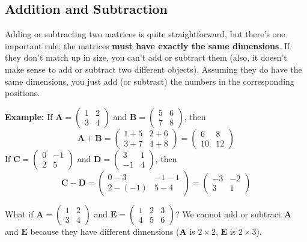 \documentclass[11pt]{article}
\begin{document}
\subsection{Addition and Subtraction}

Adding or subtracting two matrices is quite straightforward, but there's one important rule: the matrices \textbf{must have exactly the same dimensions}. If they don't match up in size, you can't add or subtract them (also, it doesn't make sense to add or subtract two different objects). Assuming they do have the same dimensions, you just add (or subtract) the numbers in the corresponding positions.

\textbf{Example:}
If $\mathbf{A} = \begin{pmatrix} 1 & 2 \\ 3 & 4 \end{pmatrix}$ and $\mathbf{B} = \begin{pmatrix} 5 & 6 \\ 7 & 8 \end{pmatrix}$, then
\[ \mathbf{A} + \mathbf{B} = \begin{pmatrix} 1+5 & 2+6 \\ 3+7 & 4+8 \end{pmatrix} = \begin{pmatrix} 6 & 8 \\ 10 & 12 \end{pmatrix} \]
If $\mathbf{C} = \begin{pmatrix} 0 & -1 \\ 2 & 5 \end{pmatrix}$ and $\mathbf{D} = \begin{pmatrix} 3 & 1 \\ -1 & 4 \end{pmatrix}$, then
\[ \mathbf{C} - \mathbf{D} = \begin{pmatrix} 0-3 & -1-1 \\ 2-(-1) & 5-4 \end{pmatrix} = \begin{pmatrix} -3 & -2 \\ 3 & 1 \end{pmatrix} \]

What if $\mathbf{A} = \begin{pmatrix} 1 & 2 \\ 3 & 4 \end{pmatrix}$ and $\mathbf{E} = \begin{pmatrix} 1 & 2 & 3 \\ 4 & 5 & 6 \end{pmatrix}$?
We cannot add or subtract $\mathbf{A}$ and $\mathbf{E}$ because they have different dimensions ($\mathbf{A}$ is $2 \times 2$, $\mathbf{E}$ is $2 \times 3$).
\end{document}
